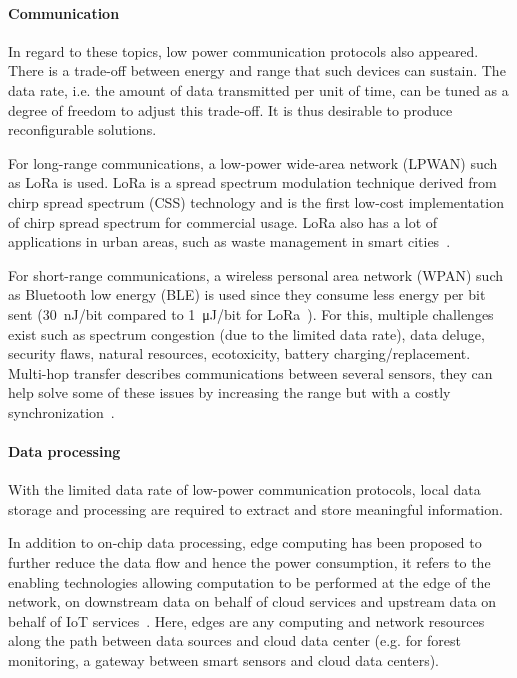 \documentclass{EPL-master-thesis-covers-EN}
\begin{document}
\paragraph{Communication}

In regard to these topics, low power communication protocols also appeared. There is a trade-off between energy and range that such devices can sustain. The data rate, i.e. the amount of data transmitted per unit of time, can be tuned as a degree of freedom to adjust this trade-off. It is thus desirable to produce reconfigurable solutions.

For long-range communications, a low-power wide-area network (LPWAN) such as LoRa is used. LoRa is a spread spectrum modulation technique derived from chirp spread spectrum (CSS) technology and is the first low-cost implementation of chirp spread spectrum for commercial usage. LoRa also has a lot of applications in urban areas, such as waste management in smart cities~\cite{Cerchecci}.

For short-range communications, a wireless personal area network (WPAN) such as Bluetooth low energy (BLE) is used since they consume less energy per bit sent (\SI{30}{nJ/bit} compared to \SI{1}{\micro J/bit} for LoRa~\cite{Local_Sensor_Data_Processing}). For this, multiple challenges exist such as spectrum congestion (due to the limited data rate), data deluge, security flaws, natural resources, ecotoxicity, battery charging/replacement. Multi-hop transfer describes communications between several sensors, they can help solve some of these issues by increasing the range but with a costly synchronization~\cite{bol2018}.

\paragraph{Data processing}

With the limited data rate of low-power communication protocols, local data storage and processing are required to extract and store meaningful information.

In addition to on-chip data processing, edge computing has been proposed to further reduce the data flow and hence the power consumption, it refers to the enabling technologies allowing computation to be performed at the edge of the network, on downstream data on behalf of cloud services and upstream data on behalf of IoT services~\cite{Shi2016}. Here, edges are any computing and network resources along the path between data sources and cloud data center (e.g. for forest monitoring, a gateway between smart sensors and cloud data centers). 
\end{document}
